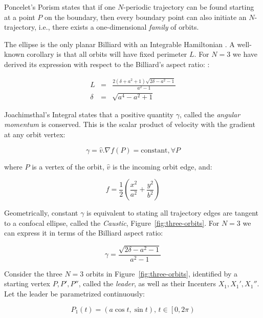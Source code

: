 Poncelet's Porism \cite{dragovic11} states that if one $N$-periodic trajectory can be found starting at a point $P$ on the boundary, then every boundary point can also initiate an $N$-trajectory, i.e., there exists a one-dimensional {\em family} of orbits.

The ellipse is the only planar Billiard with an Integrable Hamiltonian \cite{birkhoff66}. A well-known corollary is that all orbits will have fixed perimeter $L$. For $N=3$ we have derived its expression with respect to the Billiard's aspect ratio: \cite{ronaldo19a}:

\begin{eqnarray}
L&=&\frac{2(\delta+a^2+1)\sqrt{2\delta-a^2-1}}{a^2-1}\\
\delta&=&\sqrt{a^4-a^2+1}
\end{eqnarray}

Joachimsthal's Integral  \cite{sergei91} states that a positive quantity $\gamma$, called the {\em angular momentum} is conserved. This is the scalar product of velocity with the gradient at any orbit vertex:

\begin{equation}
 \gamma=\hat{v}.\nabla{f}(P)=\mbox{constant},\forall{P}
 \label{eqn:joachim}
\end{equation}

\noindent where $P$ is a vertex of the orbit, $\hat{v}$ is the incoming orbit edge, and:

\begin{equation}
f=\frac{1}{2}\left(\frac{x^2}{a^2}+\frac{y^2}{b^2}\right)
\label{eqn:f}
\end{equation}

Geometrically, constant $\gamma$ is equivalent to stating all trajectory edges are tangent to a confocal ellipse, called the {\em Caustic}, Figure~\ref{fig:three-orbits}. For $N=3$ we can express it in terms of the Billiard aspect ratio:

\begin{equation}
\gamma = \frac{\sqrt{2\delta-a^2-1}}{a^2-1}
\label{eqn:gamma}
\end{equation}


Consider the three $N=3$ orbits in Figure~\ref{fig:three-orbits}, identified by a starting vertex $P,P',P''$, called the {\em leader}, as well as their Incenters $X_1,X_1',X_1''$. Let the leader be parametrized continuously:

\begin{equation}
P_1(t)=\left(a\cos{t},\sin{t}\right),\,t\in\left[0,2\pi\right)
\label{eqn:tparam}
\end{equation}

